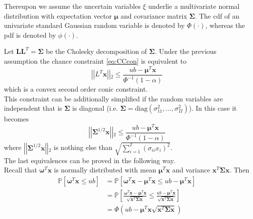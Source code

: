  \par Thereupon we assume the uncertain variables $\xi$ underlie a multivariate normal distribution with expectation vector $\boldsymbol{\mu}$ and covariance matrix ${\boldsymbol{\Sigma}}$. The cdf of an univariate standard Gaussian random variable is denoted by $\Phi(\cdot)$, whereas the pdf is denoted by $\phi(\cdot)$.
 \par Let $\boldsymbol{L}\boldsymbol{L}^{T}=\boldsymbol{\Sigma}$ be the Cholesky decomposition of $\boldsymbol{\Sigma}$. Under the previous assumption the chance constraint \eqref{eq:CCcon} is equivalent to 
 \begin{equation}\label{eq:CCeq}
 \left| \left| L^T\boldsymbol{x}  \right| \right| {}_2 \leq \frac{ub-\boldsymbol{\mu}^{T} \boldsymbol{x}}{\Phi^{-1}(1-\alpha)}
 \end{equation}
 which is a convex second order conic constraint. \\
 This constraint can be additionally simplified if the random variables are independent that is $\boldsymbol{\Sigma}$ is diagonal (i.e. $\boldsymbol{\Sigma}=\text{diag}(\sigma^2_{11},\ldots,\sigma^2_{II})$). In this case it becomes
 \begin{equation}\label{eq:CCeq}
 \left| \left| \boldsymbol{\Sigma}^{1/2} \boldsymbol{x} \right| \right| {}_2 \leq \frac{ub-\boldsymbol{\mu}^{T} \boldsymbol{x}}{\Phi^{-1}(1-\alpha)}
 \end{equation}
 where $\left| \left|\boldsymbol{\Sigma}^{1/2} \boldsymbol{x} \right| \right| {}_2$ is nothing else than $\sqrt{\sum_{i=1}^I{(\sigma_{ii}x_{i})^2}}$. \\
 The last equivalences can be proved in the following way. \\
 Recall that $\boldsymbol{\omega}^{T}\boldsymbol{x}$ is normally distributed with mean $\boldsymbol{\mu}^{T}\boldsymbol{x}$ and variance $\boldsymbol{x}^{T}\boldsymbol{\Sigma} \boldsymbol{x}$. Then
 \begin{equation}
 \begin{split}
 \mathbb{P}\left[\boldsymbol{\omega}^{T}\boldsymbol{x} \leq ub \right] &=\mathbb{P}\left[\boldsymbol{\omega}^{T}\boldsymbol{x} - \boldsymbol{\mu}^{T}\boldsymbol{x} \leq ub - \boldsymbol{\mu}^{T}\boldsymbol{x}\right] \\
 &= \mathbb{P}\left[ \frac{\boldsymbol{\omega}^{T}\boldsymbol{x} - \boldsymbol{\mu}^{T}\boldsymbol{x}}{\sqrt{\boldsymbol{x}^{T}\boldsymbol{\Sigma} \boldsymbol{x}}} \leq \frac{ub  - \boldsymbol{\mu}^{T}\boldsymbol{x}}{\sqrt{\boldsymbol{x}^{T}\boldsymbol{\Sigma} \boldsymbol{x}}} \right] \\
 &= \Phi\left(ub  - \boldsymbol{\mu}^{T}\boldsymbol{x}{\sqrt{\boldsymbol{x}^{T}\boldsymbol{\Sigma} \boldsymbol{x}}} \right) 
\end{split}
 \end{equation}
